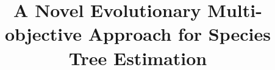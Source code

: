 \documentclass[runningheads]{llncs}
\begin{document}
%
\title{A Novel Evolutionary Multi-objective Approach for Species Tree Estimation }
\author{}
\institute{}
%
\maketitle              %
%

 
 






%
%
%


\end{document}
